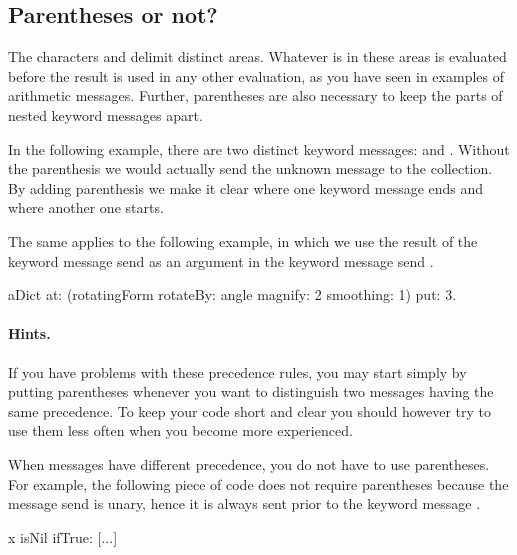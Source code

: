 \documentclass[a4paper,10pt,twoside]{book}
\begin{document}
\subsection{Parentheses or not?}
The characters \ct{[]} and \ct{()} delimit distinct areas.
Whatever is in these areas is evaluated before the result is used in any other evaluation, as you have seen in examples of arithmetic messages.
Further, parentheses are also necessary to keep the parts of nested keyword messages apart.

In the following example, there are two distinct keyword messages:  and .
Without the parenthesis we would actually send the unknown message  to the collection.
By adding parenthesis we make it clear where one keyword message ends and where another one starts.


The same applies to the following example, in which we use the result of the keyword message send  as an argument in the keyword message send .

\begin{code}{}
aDict
   at: (rotatingForm
           rotateBy: angle
           magnify: 2
           smoothing: 1)
   put: 3.
\end{code}

\paragraph{Hints.}
If you have problems with these precedence rules, you may start simply by putting parentheses whenever you want to distinguish two messages having the same precedence.
To keep your code short and clear you should however try to use them less often when you become more experienced.

When messages have different precedence, you do not have to use parentheses.
For example, the following piece of code does not require parentheses because the message send  is unary, hence it is always sent prior to the keyword message .
\begin{code}{}
x isNil ifTrue: [...]
\end{code}

\end{document}
